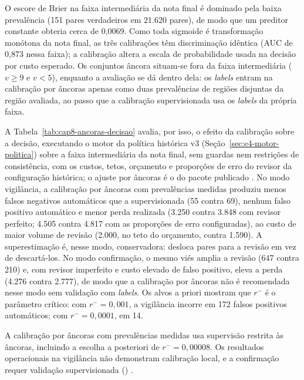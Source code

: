 O escore de Brier na faixa intermediária da nota final é dominado pela baixa prevalência (151 pares verdadeiros em 21.620 pares), de modo que um preditor constante obteria cerca de 0,0069. Como toda sigmoide é transformação monótona da nota final, as três calibrações têm discriminação idêntica (AUC de 0,873 nessa faixa); a calibração altera a escala de probabilidade usada na decisão por custo esperado. Os conjuntos âncora situam-se fora da faixa intermediária ($v\geq 9$ e $v<5$), enquanto a avaliação se dá dentro dela: os \textit{labels} entram na calibração por âncoras apenas como duas prevalências de regiões disjuntas da região avaliada, ao passo que a calibração supervisionada usa os \textit{labels} da própria faixa.

A Tabela~\ref{tab:cap8-ancoras-decisao} avalia, por isso, o efeito da calibração sobre a decisão, executando o motor da política histórica v3 (Seção~\ref{sec:e4-motor-politica}) sobre a faixa intermediária da nota final, sem guardas nem restrições de consistência, com os custos, tetos, orçamento e proporções de erro do revisor da configuração histórica; o ajuste por âncoras é o do pacote publicado \cite{Jardim2026gzcmd}. No modo vigilância, a calibração por âncoras com prevalências medidas produziu menos falsos negativos automáticos que a supervisionada (55 contra 69), nenhum falso positivo automático e menor perda realizada (3.250 contra 3.848 com revisor perfeito; 4.505 contra 4.817 com as proporções de erro configuradas), ao custo de maior volume de revisão (2.000, no teto do orçamento, contra 1.590). A superestimação é, nesse modo, conservadora: desloca pares para a revisão em vez de descartá-los. No modo confirmação, o mesmo viés amplia a revisão (647 contra 210) e, com revisor imperfeito e custo elevado de falso positivo, eleva a perda (4.276 contra 2.777), de modo que a calibração por âncoras não é recomendada nesse modo sem validação com \textit{labels}. Os alvos a priori mostram que $r^-$ é o parâmetro crítico: com $r^- = 0{,}001$, a vigilância incorre em 172 falsos positivos automáticos; com $r^- = 0{,}0001$, em 14.



A calibração por âncoras com prevalências medidas usa supervisão restrita às âncoras, incluindo a escolha a posteriori de $r^-=0{,}00008$. Os resultados operacionais na vigilância não demonstram calibração local, e a confirmação requer validação supervisionada () \cite{Jardim2026phdrepo}.

